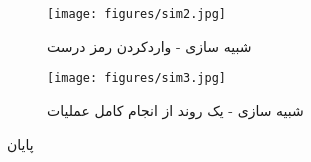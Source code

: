 \documentclass[a4paper]{article}
\newcommand{\goodbye}{\begin{center}{\huge
پایان
}\end{center}}
\begin{document}
\begin{figure}[H]
	\begin{small}
		\begin{center}
			\texttt{[image: figures/sim2.jpg]}
		\end{center}
		\caption{شبیه سازی - واردکردن رمز درست}
		\label{fig:sim2}
	\end{small}
\end{figure}

\begin{figure}[H]
	\begin{small}
		\begin{center}
			\texttt{[image: figures/sim3.jpg]}
		\end{center}
		\caption{شبیه سازی - یک روند از انجام کامل عملیات}
		\label{fig:sim3}
	\end{small}
\end{figure}

\newpage
\goodbye
\end{document}
